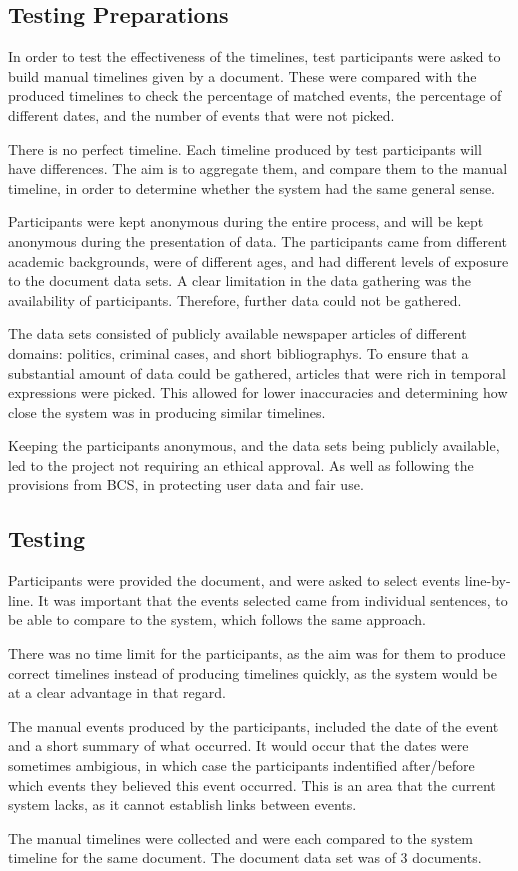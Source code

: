 \subsection{Testing Preparations}
\par In order to test the effectiveness of the timelines, test participants were asked to build manual timelines given by a document. These were compared with the produced timelines to check the percentage of matched events, the percentage of different dates, and the number of events that were not picked.
\par There is no perfect timeline. Each timeline produced by test participants will have differences. The aim is to aggregate them, and compare them to the manual timeline, in order to determine whether the system had the same general sense.
\par Participants were kept anonymous during the entire process, and will be kept anonymous during the presentation of data. The participants came from different academic backgrounds, were of different ages, and had different levels of exposure to the document data sets. A clear limitation in the data gathering was the availability of participants. Therefore, further data could not be gathered. 
\par The data sets consisted of publicly available newspaper articles of different domains: politics, criminal cases, and short bibliographys. To ensure that a substantial amount of data could be gathered, articles that were rich in temporal expressions were picked. This allowed for lower inaccuracies and determining how close the system was in producing similar timelines.
\par Keeping the participants anonymous, and the data sets being publicly available, led to the project not requiring an ethical approval. As well as following the provisions from BCS, in protecting user data and fair use.

\subsection{Testing}
\par Participants were provided the document, and were asked to select events line-by-line. It was important that the events selected came from individual sentences, to be able to compare to the system, which follows the same approach. 
\par There was no time limit for the participants, as the aim was for them to produce correct timelines instead of producing timelines quickly, as the system would be at a clear advantage in that regard.
\par The manual events produced by the participants, included the date of the event and a short summary of what occurred. It would occur that the dates were sometimes ambigious, in which case the participants indentified after/before which events they believed this event occurred. This is an area that the current system lacks, as it cannot establish links between events.
\par The manual timelines were collected and were each compared to the system timeline for the same document. The document data set was of 3 documents.

